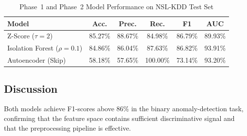 \documentclass[conference]{IEEEtran}
\begin{document}
\begin{table}[H]
  \centering
  \caption{Phase~1 and Phase~2 Model Performance on NSL-KDD Test Set}
  \label{tab:results}
  \begin{tabular}{lccccc}
    \toprule
    \textbf{Model}         & \textbf{Acc.} & \textbf{Prec.} & \textbf{Rec.} & \textbf{F1} & \textbf{AUC} \\
    \midrule
    Z-Score ($\tau=2$)      & 85.27\%       & 88.67\%        & 84.98\%       & 86.79\%     & 89.93\%      \\
    Isolation Forest ($\rho=0.1$)
                            & 84.86\%       & 86.04\%        & 87.63\%       & 86.82\%     & 93.91\%      \\
    Autoencoder (Skip)      & 58.18\%       & 57.65\%        & 100.00\%      & 73.14\%     & 93.20\%      \\
    \bottomrule
  \end{tabular}
\end{table}

\subsection{Discussion}
\label{ssec:discussion}

Both models achieve F1-scores above 86\% in the binary anomaly-detection task,
confirming that the feature space contains sufficient discriminative signal and
that the preprocessing pipeline is effective.
\end{document}
